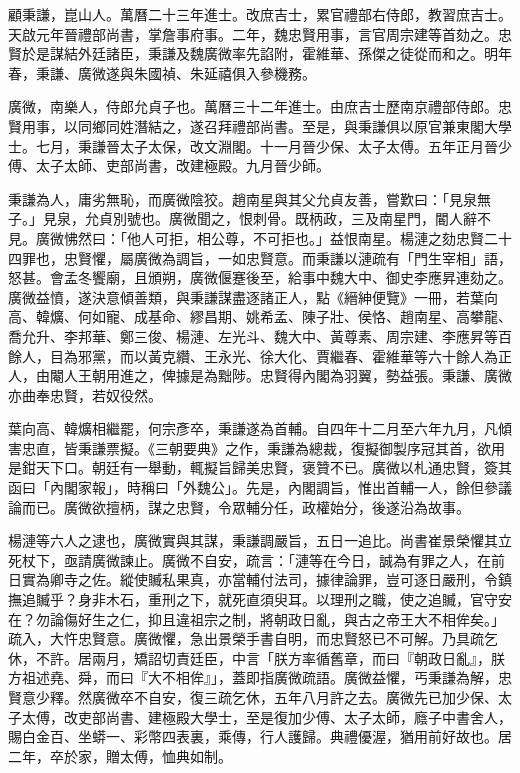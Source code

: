 \begin{pinyinscope}
顧秉謙，崑山人。萬曆二十三年進士。改庶吉士，累官禮部右侍郎，教習庶吉士。天啟元年晉禮部尚書，掌詹事府事。二年，魏忠賢用事，言官周宗建等首劾之。忠賢於是謀結外廷諸臣，秉謙及魏廣微率先諂附，霍維華、孫傑之徒從而和之。明年春，秉謙、廣微遂與朱國禎、朱延禧俱入參機務。

廣微，南樂人，侍郎允貞子也。萬曆三十二年進士。由庶吉士歷南京禮部侍郎。忠賢用事，以同鄉同姓潛結之，遂召拜禮部尚書。至是，與秉謙俱以原官兼東閣大學士。七月，秉謙晉太子太保，改文淵閣。十一月晉少保、太子太傅。五年正月晉少傅、太子太師、吏部尚書，改建極殿。九月晉少師。

秉謙為人，庸劣無恥，而廣微陰狡。趙南星與其父允貞友善，嘗歎曰：「見泉無子。」見泉，允貞別號也。廣微聞之，恨刺骨。既柄政，三及南星門，閽人辭不見。廣微怫然曰：「他人可拒，相公尊，不可拒也。」益恨南星。楊漣之劾忠賢二十四罪也，忠賢懼，屬廣微為調旨，一如忠賢意。而秉謙以漣疏有「門生宰相」語，怒甚。會孟冬饗廟，且頒朔，廣微偃蹇後至，給事中魏大中、御史李應昇連劾之。廣微益憤，遂決意傾善類，與秉謙謀盡逐諸正人，點《縉紳便覽》一冊，若葉向高、韓爌、何如寵、成基命、繆昌期、姚希孟、陳子壯、侯恪、趙南星、高攀龍、喬允升、李邦華、鄭三俊、楊漣、左光斗、魏大中、黃尊素、周宗建、李應昇等百餘人，目為邪黨，而以黃克纘、王永光、徐大化、賈繼春、霍維華等六十餘人為正人，由閹人王朝用進之，俾據是為黜陟。忠賢得內閣為羽翼，勢益張。秉謙、廣微亦曲奉忠賢，若奴役然。

葉向高、韓爌相繼罷，何宗彥卒，秉謙遂為首輔。自四年十二月至六年九月，凡傾害忠直，皆秉謙票擬。《三朝要典》之作，秉謙為總裁，復擬御製序冠其首，欲用是鉗天下口。朝廷有一舉動，輒擬旨歸美忠賢，褒贊不已。廣微以札通忠賢，簽其函曰「內閣家報」，時稱曰「外魏公」。先是，內閣調旨，惟出首輔一人，餘但參議論而已。廣微欲擅柄，謀之忠賢，令眾輔分任，政權始分，後遂沿為故事。

楊漣等六人之逮也，廣微實與其謀，秉謙調嚴旨，五日一追比。尚書崔景榮懼其立死杖下，亟請廣微諫止。廣微不自安，疏言：「漣等在今日，誠為有罪之人，在前日實為卿寺之佐。縱使贓私果真，亦當輔付法司，據律論罪，豈可逐日嚴刑，令鎮撫追贓乎？身非木石，重刑之下，就死直須臾耳。以理刑之職，使之追贓，官守安在？勿論傷好生之仁，抑且違祖宗之制，將朝政日亂，與古之帝王大不相侔矣。」疏入，大忤忠賢意。廣微懼，急出景榮手書自明，而忠賢怒已不可解。乃具疏乞休，不許。居兩月，矯詔切責廷臣，中言「朕方率循舊章，而曰『朝政日亂』，朕方祖述堯、舜，而曰『大不相侔』」，蓋即指廣微疏語。廣微益懼，丐秉謙為解，忠賢意少釋。然廣微卒不自安，復三疏乞休，五年八月許之去。廣微先已加少保、太子太傅，改吏部尚書、建極殿大學士，至是復加少傅、太子太師，廕子中書舍人，賜白金百、坐蟒一、彩幣四表裏，乘傳，行人護歸。典禮優渥，猶用前好故也。居二年，卒於家，贈太傅，恤典如制。


\end{pinyinscope}

